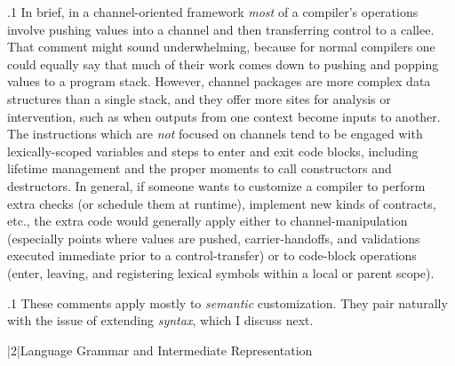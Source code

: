 \documentclass[11pt, twocolumn]{article}
\begin{document}
\p.1{%
In brief, in a channel-oriented framework \textit{most} of a compiler's
operations involve pushing values into a channel and then transferring
control to a callee. That comment might sound underwhelming, because
for normal compilers one could equally say that much of their work
comes down to pushing and popping values to a program stack.
However, channel packages are more complex data structures
than a single stack, and they offer more sites for analysis
or intervention, such as when outputs from one context become
inputs to another. The  instructions which are \textit{not} focused
on channels tend to be engaged with lexically-scoped variables
and steps to enter and exit code blocks, including lifetime
management and the proper moments to call constructors and destructors.
In general, if someone wants to customize a compiler to perform
extra checks (or schedule them at runtime), implement new
kinds of contracts, etc., the extra code would generally apply
either to channel-manipulation (especially points where values are
pushed, carrier-handoffs, and validations executed immediate
prior to a control-transfer) or to code-block operations
(enter, leaving, and registering lexical symbols within a local or parent scope).
}%

\p.1{%
These comments apply mostly to \textit{semantic} customization. They pair
naturally with the issue of extending \textit{syntax}, which I discuss next.
}%


\s|2|{Language Grammar and Intermediate Representation}
\end{document}
